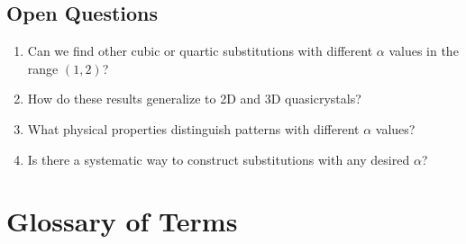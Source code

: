 \documentclass[11pt,letterpaper]{article}
\begin{document}
\subsection{Open Questions}

\begin{enumerate}
    \item Can we find other cubic or quartic substitutions with different $\alpha$ values in the range $(1, 2)$?

    \item How do these results generalize to 2D and 3D quasicrystals?

    \item What physical properties distinguish patterns with different $\alpha$ values?

    \item Is there a systematic way to construct substitutions with any desired $\alpha$?
\end{enumerate}

\section{Glossary of Terms}
\end{document}
